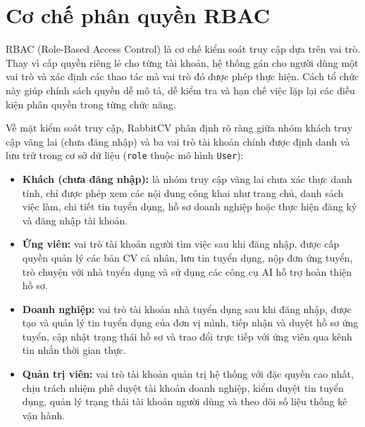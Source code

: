 


\section{Cơ chế phân quyền RBAC}

RBAC (Role-Based Access Control) là cơ chế kiểm soát truy cập dựa trên vai trò. Thay vì cấp quyền riêng lẻ cho từng tài khoản, hệ thống gán cho người dùng một vai trò và xác định các thao tác mà vai trò đó được phép thực hiện. Cách tổ chức này giúp chính sách quyền dễ mô tả, dễ kiểm tra và hạn chế việc lặp lại các điều kiện phân quyền trong từng chức năng.

Về mặt kiểm soát truy cập, RabbitCV phân định rõ ràng giữa nhóm khách truy cập vãng lai (chưa đăng nhập) và ba vai trò tài khoản chính được định danh và lưu trữ trong cơ sở dữ liệu (\texttt{role} thuộc mô hình \texttt{User}):

\begin{itemize}
    \item \textbf{Khách (chưa đăng nhập):} là nhóm truy cập vãng lai chưa xác thực danh tính, chỉ được phép xem các nội dung công khai như trang chủ, danh sách việc làm, chi tiết tin tuyển dụng, hồ sơ doanh nghiệp hoặc thực hiện đăng ký và đăng nhập tài khoản.
    \item \textbf{Ứng viên:} vai trò tài khoản người tìm việc sau khi đăng nhập, được cấp quyền quản lý các bản CV cá nhân, lưu tin tuyển dụng, nộp đơn ứng tuyển, trò chuyện với nhà tuyển dụng và sử dụng các công cụ AI hỗ trợ hoàn thiện hồ sơ.
    \item \textbf{Doanh nghiệp:} vai trò tài khoản nhà tuyển dụng sau khi đăng nhập, được tạo và quản lý tin tuyển dụng của đơn vị mình, tiếp nhận và duyệt hồ sơ ứng tuyển, cập nhật trạng thái hồ sơ và trao đổi trực tiếp với ứng viên qua kênh tin nhắn thời gian thực.
    \item \textbf{Quản trị viên:} vai trò tài khoản quản trị hệ thống với đặc quyền cao nhất, chịu trách nhiệm phê duyệt tài khoản doanh nghiệp, kiểm duyệt tin tuyển dụng, quản lý trạng thái tài khoản người dùng và theo dõi số liệu thống kê vận hành.
\end{itemize}

